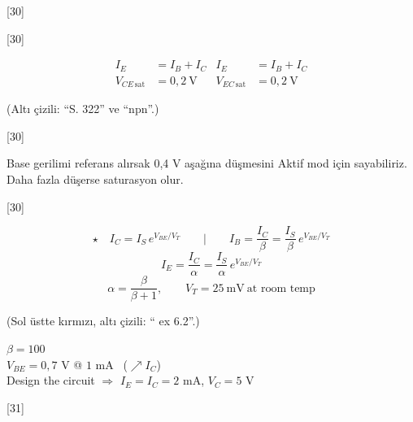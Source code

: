 \documentclass[11pt,a4paper]{article}
\begin{document}
[30]

[30]

\begin{align*}
I_E &= I_B+I_C & I_E &= I_B+I_C \\
V_{CE\,\mathrm{sat}} &= 0{,}2\ \mathrm{V} & V_{EC\,\mathrm{sat}} &= 0{,}2\ \mathrm{V}
\end{align*}

{\small\color{kursunkalem}(Altı çizili: ``S. 322'' ve ``npn''.)}

[30]

Base gerilimi referans alırsak 0,4 V aşağına düşmesini Aktif mod için sayabiliriz. Daha fazla düşerse saturasyon olur.

[30]

\[ \star\quad I_C = I_S\,e^{V_{BE}/V_T} \qquad\Big|\qquad I_B = \frac{I_C}{\beta} = \frac{I_S}{\beta}\,e^{V_{BE}/V_T} \]
\[ I_E = \frac{I_C}{\alpha} = \frac{I_S}{\alpha}\,e^{V_{BE}/V_T} \]
\[ \alpha = \frac{\beta}{\beta+1}, \qquad V_T = 25\ \mathrm{mV}\ \text{at room temp} \]

{\small\color{kursunkalem}(Sol üstte kırmızı, altı çizili: `` ex 6.2''.)}

\begin{ornek}[6.2]
$\beta = 100$\\
$V_{BE} = 0{,}7$ V @ $1$ mA \ ($\nearrow I_C$)\\
Design the circuit $\Rightarrow$ $I_E = I_C = 2$ mA, $V_C = 5$ V

[31]
\end{ornek}
\end{document}

